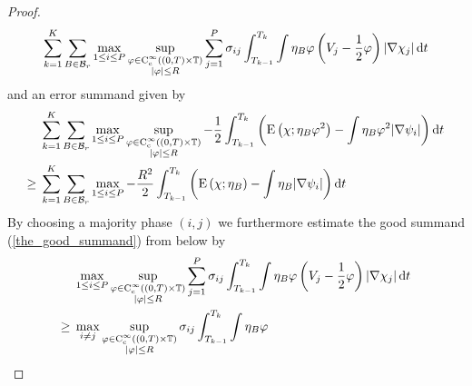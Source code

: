 \begin{proof}
\begin{equation}
		\label{the_good_summand}
		\sum_{ k = 1 }^{ K }
		\sum_{ B \in \mathcal{ B }_{ r } }
		\max_{ 1 \leq i \leq P }
		\sup_{ 
			\substack{ 
				\varphi \in \operatorname{C}_{ \mathrm{c} }^{ \infty } 
				\left( ( 0 , T ) \times \operatorname{\mathbb{T}} \right)
				\\
				\abs{ \varphi } \leq R  
			}
		}
		\sum_{ j = 1 }^{ P }
		\sigma_{ i j }
		\int_{ T_{ k - 1 } }^{ T_{ k } } 
		\int\eta_{ B }
		\varphi 
		\left( V_{ j } - \frac{ 1 }{ 2 } \varphi \right)
		\abs{ \nabla \chi_{ j } }
		\dd{ t } 
	\end{equation}
	and an error summand given by
	\begin{align}
		\notag
		& \sum_{ k = 1 }^{ K }
			\sum_{ B \in \mathcal{ B }_{ r } }
				\max_{ 1 \leq i \leq P }
					\sup_{ \substack{ 
							\varphi \in \operatorname{C}_{ \mathrm{c} }^{ \infty } 
							\left( ( 0 , T ) \times \operatorname{\mathbb{T}} \right)
							\\
							\abs{ \varphi } \leq R  
					} }
				- \frac{ 1 }{ 2 }
				\int_{ T_{ k - 1 } }^{ T_{ k } }
				\left(
				\operatorname{E} \left( \chi ; \eta_{ B } \varphi^{ 2 } \right)
				-
				\int
				\eta_{ B }
				\varphi^{ 2 }
				\abs{ \nabla \psi_{ i } }
				\right)
				\dd{ t }
		\\
		\label{minor_error_term}
		\geq{} &
		\sum_{ k = 1 }^{ K }
		\sum_{ B \in \mathcal{ B }_{ r } }
		\max_{ 1 \leq i \leq P }
		- \frac{ R^{ 2 } }{ 2 }
		\int_{ T_{ k - 1 } }^{ T_{ k } }
		\left(
		\operatorname{E} \left( \chi ; \eta_{ B } \right)
		-
		\int
		\eta_{ B }
		\abs{ \nabla \psi_{ i } }
		\right)
		\dd{ t }
	\end{align}
	By choosing a majority phase $ ( i , j ) $ we furthermore estimate the good 
	summand (\ref{the_good_summand}) from below by
	\begin{align}
		\notag
		& \max_{ 1 \leq i \leq P }
		\sup_{ \substack{ 
				\varphi \in \cont_{ \mathrm{c} }^{ \infty } 
				\left( ( 0 , T ) \times \flattorus \right)
				\\
				\abs{ \varphi } \leq R  
		} }
		\sum_{ j = 1 }^{ P }
			\sigma_{ i j }
			\int_{ T_{ k  - 1 } }^{ T_{ k } }
				\int
					\eta_{ B } \varphi
					\left( V_{ j } - \frac{ 1 }{ 2 } \varphi  \right)
				\abs{ \nabla \chi_{ j } }
			\dd{ t }
		\\
		\notag
		\geq{} &
		\max_{ i \neq j }
		\sup_{ \substack{ 
				\varphi \in \cont_{ \mathrm{c} }^{ \infty } 
				\left( ( 0 , T ) \times \flattorus \right)
				\\
				\abs{ \varphi } \leq R  
		} }
		\sigma_{ i j }
		\int_{ T_{ k  - 1 } }^{ T_{ k } }
		\int
		\eta_{ B } \varphi

\end{align}
\end{proof}
